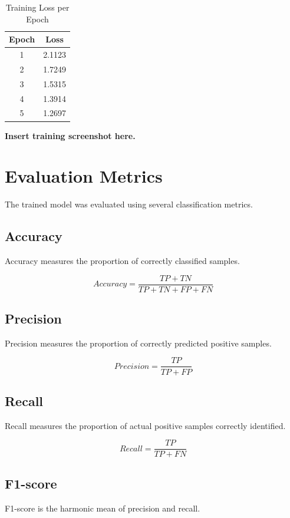 \documentclass[12pt]{article}
\begin{document}
\begin{table}[H]
\centering
\begin{tabular}{cc}
\toprule
Epoch & Loss \\
\midrule
1 & 2.1123 \\
2 & 1.7249 \\
3 & 1.5315 \\
4 & 1.3914 \\
5 & 1.2697 \\
\bottomrule
\end{tabular}
\caption{Training Loss per Epoch}
\end{table}

\textbf{Insert training screenshot here.}

\section{Evaluation Metrics}

The trained model was evaluated using several classification metrics.

\subsection{Accuracy}

Accuracy measures the proportion of correctly classified samples.

\[
Accuracy = \frac{TP + TN}{TP + TN + FP + FN}
\]

\subsection{Precision}

Precision measures the proportion of correctly predicted positive samples.

\[
Precision = \frac{TP}{TP + FP}
\]

\subsection{Recall}

Recall measures the proportion of actual positive samples correctly identified.

\[
Recall = \frac{TP}{TP + FN}
\]

\subsection{F1-score}

F1-score is the harmonic mean of precision and recall.
\end{document}
